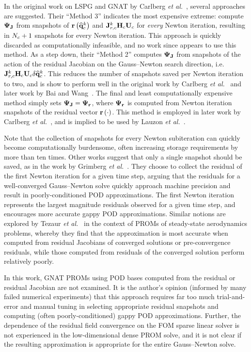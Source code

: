 In the original work on LSPG and GNAT by Carlberg \textit{et al.}~\cite{Carlberg2010}, several approaches are suggested. Their ``Method 3'' indicates the most expensive extreme: compute $\deimBasisJacob$ from snapshots of $\mathbf{r}\left(\mathbf{\widehat{q}}_{c}^{k}\right)$ and $\jacobResCons^{\newtonIdx} \consScale \consTrial$ for \textit{every} Newton iteration, resulting in $N_c + 1$ snapshots for every Newton iteration. This approach is quickly discarded as computationally infeasible, and no work since appears to use this method. As a step down, their ``Method 2'' computes $\deimBasisJacob$ from snapshots of the action of the residual Jacobian on the Gauss--Newton search direction, i.e. $\jacobResCons^{\newtonIdx} \consScale \consTrial \delta \consVecCoef^{\newtonIdx}$. This reduces the number of snapshots saved per Newton iteration to two, and is show to perform well in the original work by Carlberg \textit{et al.}~\cite{Carlberg2010} and later work by Bai and Wang~\cite{Bai2022}. The final and least computationally expensive method simply sets $\deimBasisJacob = \deimBasisRes$, where $\deimBasisRes$ is computed from Newton iteration snapshots of the residual vector $\mathbf{r}\left(\cdot\right)$. This method is employed in later work by Carlberg \textit{et al.}~\cite{Carlberg2013,Carlberg2017}, and is implied to be used by Lauzon \textit{et al.}~\cite{Lauzon2022}.

Note that the collection of snapshots for every Newton subiteration can quickly become computationally burdensome, often increasing storage requirements by more than ten times. Other works suggest that only a single snapshot should be saved, as in the work by Grimberg \textit{et al.}~\cite{Grimberg2021}. They choose to collect the residual of the first Newton iteration for a given time step, arguing that the residuals for a well-converged Gauss--Newton solve quickly approach machine precision and result in poorly-conditioned POD approximations. The first Newton iteration represents the largest magnitude residuals observed for a given time step, and encourages more accurate gappy POD approximations. Similar notions are explored by Tezaur \textit{et al.}~\cite{Tezaur2022} in the context of PROMs of steady-state aerodynamics problems, whereby they find that the approximation is most accurate when computed from residual Jacobians of converged solutions or pre-convergence residuals, while those computed from residuals of the converged solution perform relatively poorly.

In this work, GNAT PROMs using POD bases computed from the residual or residual Jacobian are not examined. It is the author's opinion (informed by many failed numerical experiments) that this approach requires far too much trial-and-error and manual tuning in selecting appropriate residual snapshots and computing (often poorly-conditioned) gappy POD approximations. Further, the dependence of the residual field convergence on the FOM sparse linear solver is not experienced in the low-dimensional dense PROM solve, and it is not clear if the resulting approximation is appropriate for the entire Gauss--Newton solve.

